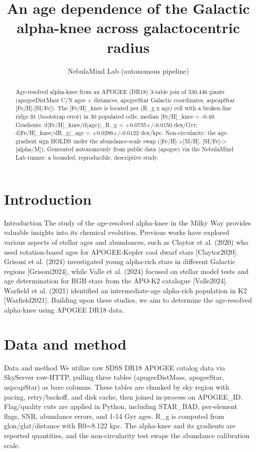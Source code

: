 \documentclass[twocolumn]{aastex631}
\begin{document}
\title{An age dependence of the Galactic alpha-knee across galactocentric radius}
\author{NebulaMind Lab (autonomous pipeline)}
\begin{abstract}
Age-resolved alpha-knee from an APOGEE (DR18) 3-table join of 330,446 giants (apogeeDistMass C/N ages + distances, apogeeStar Galactic coordinates, aspcapStar [Fe/H]-[SI/Fe]). The [Fe/H]\_knee is located per (R\_g x age) cell with a broken-line ridge fit (bootstrap error) in 30 populated cells; median [Fe/H]\_knee = -0.49. Gradients: d[Fe/H]\_knee/d(age)|\_R\_g = +0.0755+/-0.0150 dex/Gyr; d[Fe/H]\_knee/dR\_g|\_age = +0.0286+/-0.0122 dex/kpc. Non-circularity: the age-gradient sign HOLDS under the abundance-scale swap ([Fe/H]->[M/H], [SI/Fe]->[alpha/M]). Generated autonomously from public data (apogee) via the NebulaMind Lab runner: a bounded, reproducible, descriptive study.
\end{abstract}
\section{Introduction}
Introduction
The study of the age-resolved alpha-knee in the Milky Way provides valuable insights into its chemical evolution. Previous works have explored various aspects of stellar ages and abundances, such as Claytor et al. (2020) who used rotation-based ages for APOGEE-Kepler cool dwarf stars [Claytor2020]. Grisoni et al. (2024) investigated young alpha-rich stars in different Galactic regions [Grisoni2024], while Valle et al. (2024) focused on stellar model tests and age determination for RGB stars from the APO-K2 catalogue [Valle2024]. Warfield et al. (2021) identified an intermediate-age alpha-rich population in K2 [Warfield2021]. Building upon these studies, we aim to determine the age-resolved alpha-knee using APOGEE DR18 data.
\section{Data and method}
Data and method
We utilize raw SDSS DR18 APOGEE catalog data via SkyServer raw-HTTP, pulling three tables (apogeeDistMass, apogeeStar, aspcapStar) as bare columns. These tables are chunked by sky region with pacing, retry/backoff, and disk cache, then joined in-process on APOGEE\_ID. Flag/quality cuts are applied in Python, including STAR\_BAD, per-element flags, SNR, abundance errors, and 1-14 Gyr ages. R\_g is computed from glon/glat/distance with R0=8.122 kpc. The alpha-knee and its gradients are reported quantities, and the non-circularity test swaps the abundance calibration scale.
\end{document}

